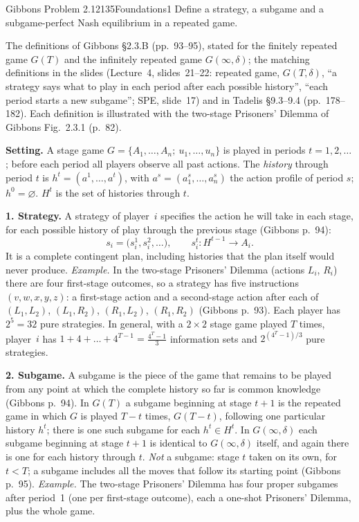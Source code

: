 \begin{exsol}{Gibbons Problem 2.12}{135}{Foundations}{1}
\asked Define a strategy, a subgame and a subgame-perfect Nash equilibrium in a repeated game.

\method The definitions of Gibbons \S2.3.B (pp.~93--95), stated for the finitely repeated game
$G(T)$ and the infinitely repeated game $G(\infty, \delta)$; the matching definitions in the slides
(Lecture~4, slides~21--22: repeated game, $G(T,\delta)$, ``a strategy says what to play in each
period after each possible history'', ``each period starts a new subgame''; SPE, slide~17) and in
Tadelis \S9.3--9.4 (pp.~178--182). Each definition is illustrated with the two-stage Prisoners'
Dilemma of Gibbons Fig.~2.3.1 (p.~82).

\solution
\textbf{Setting.} A stage game $G = \{A_1, \dots, A_n;\ u_1, \dots, u_n\}$ is played in periods
$t = 1, 2, \dots$; before each period all players observe all past actions. The \emph{history} through
period $t$ is $h^t = (a^1, \dots, a^t)$, with $a^s = (a_1^s, \dots, a_n^s)$ the action profile of
period $s$; $h^0 = \varnothing$. $H^t$ is the set of histories through $t$.

\textbf{1. Strategy.} A strategy of player~$i$ specifies the action he will take in each stage, for
each possible history of play through the previous stage (Gibbons p.~94):
\[
  s_i = \bigl(s_i^1, s_i^2, \dots\bigr), \qquad s_i^{t}: H^{t-1} \to A_i .
\]
It is a complete contingent plan, including histories that the plan itself would never produce.
\emph{Example.} In the two-stage Prisoners' Dilemma (actions $L_i$, $R_i$) there are four
first-stage outcomes, so a strategy has five instructions $(v, w, x, y, z)$: a first-stage action
and a second-stage action after each of $(L_1,L_2)$, $(L_1,R_2)$, $(R_1,L_2)$, $(R_1,R_2)$
(Gibbons p.~93). Each player has $2^5 = 32$ pure strategies. In general, with a $2\times2$ stage
game played $T$ times, player~$i$ has $1 + 4 + \dots + 4^{T-1} = \frac{4^T - 1}{3}$ information
sets and $2^{(4^T-1)/3}$ pure strategies.

\textbf{2. Subgame.} A subgame is the piece of the game that remains to be played from any point at
which the complete history so far is common knowledge (Gibbons p.~94). In $G(T)$ a subgame beginning
at stage $t+1$ is the repeated game in which $G$ is played $T - t$ times, $G(T-t)$, following one
particular history $h^t$; there is one such subgame for each $h^t \in H^t$. In $G(\infty,\delta)$ each
subgame beginning at stage $t+1$ is identical to $G(\infty,\delta)$ itself, and again there is one for
each history through $t$. \emph{Not} a subgame: stage $t$ taken on its own, for $t < T$; a subgame
includes all the moves that follow its starting point (Gibbons p.~95). \emph{Example.} The
two-stage Prisoners' Dilemma has four proper subgames after period~1 (one per first-stage outcome),
each a one-shot Prisoners' Dilemma, plus the whole game.


\end{exsol}
